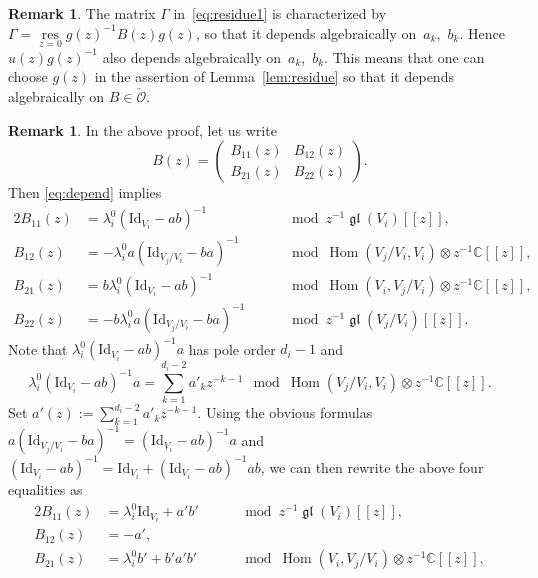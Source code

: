 \documentclass[pdftex]{sigma}
\numberwithin{equation}{section}
\theoremstyle{definition}
\newtheorem{Remark}[Theorem]{Remark}
\newcommand{\lemref}[1]{Lemma~\ref{#1}}
\newcommand{\C}{\mathbb{C}} %
\newcommand{\gl}{\operatorname{\mathfrak{gl}}}
\newcommand{\Hom}{\operatorname{Hom}}
\newcommand{\unit}{\mathrm{Id}}
\newcommand{\res}{\operatorname*{res}}
\newcommand{\bO}{\mathcal{O}}
\begin{document}
\begin{Remark}\label{rem:depend-gauge}
The matrix $\Gamma$ in~\eqref{eq:residue1} is characterized by
$\Gamma = \res\limits_{z=0} g(z)^{-1}B(z)g(z)$,
so that it depends algebraically on~$a_k$,~$b_k$.
Hence $u(z)g(z)^{-1}$ also depends algebraically on~$a_k$,~$b_k$.
This means that one can choose $g(z)$ in the assertion of
\lemref{lem:residue} so that it depends
algebraically on $B \in \check{\bO}$.
\end{Remark}

\begin{Remark}\label{rem:depend-B}
In the above proof, let us write
\[
B(z) =
\begin{pmatrix}
B_{11}(z) & B_{12}(z) \\ B_{21}(z) & B_{22}(z)
\end{pmatrix}.
\]
Then \eqref{eq:depend} implies
\begin{alignat*}{2}
B_{11}(z) &= \lambda_i^0(\unit_{V_i}-ab)^{-1}
&\quad &\mod z^{-1}\gl(V_i)[[z]], \\
B_{12}(z) &= -\lambda_i^0 a(\unit_{V_j/V_i}-ba)^{-1}
&\quad &\mod \Hom(V_j/V_i,V_i) \otimes z^{-1}\C[[z]], \\
B_{21}(z) &= b\lambda_i^0(\unit_{V_i}-ab)^{-1}
&\quad &\mod \Hom(V_i,V_j/V_i) \otimes z^{-1}\C[[z]], \\
B_{22}(z) &= -b\lambda_i^0 a(\unit_{V_j/V_i}-ba)^{-1}
&\quad &\mod z^{-1}\gl(V_j/V_i)[[z]].
\end{alignat*}
Note that $\lambda_i^0 (\unit_{V_i}-ab)^{-1}a$ has pole order $d_i-1$ and
\[
\lambda_i^0 (\unit_{V_i}-ab)^{-1}a = \sum_{k=1}^{d_i-2} a'_k z^{-k-1}
\mod \Hom(V_j/V_i,V_i) \otimes z^{-1}\C[[z]].
\]
Set $a'(z) :=\sum\limits_{k=1}^{d_i-2} a'_k z^{-k-1}$.
Using the obvious formulas
$a(\unit_{V_j/V_i}-ba)^{-1}=(\unit_{V_i}-ab)^{-1}a$ and
$(\unit_{V_i}-ab)^{-1}=\unit_{V_i}+(\unit_{V_i}-ab)^{-1}ab$,
we can then rewrite the above four equalities as
\begin{alignat}{2}
B_{11}(z) &= \lambda_i^0\unit_{V_i} + a'b'
&\quad &\mod z^{-1}\gl(V_i)[[z]], \label{eq:depend-B-1}\\
B_{12}(z) &= -a', \label{eq:depend-B-2}\\
B_{21}(z) &= \lambda_i^0b' + b'a'b'
&\quad &\mod \Hom(V_i,V_j/V_i) \otimes z^{-1}\C[[z]], \label{eq:depend-B-3}\\

\end{alignat}
\end{Remark}
\end{document}
